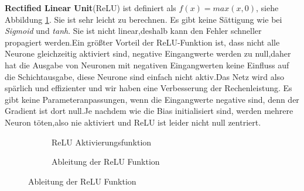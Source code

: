 \documentclass[12pt,a4paper]{scrartcl}
\numberwithin{equation}{section}
\begin{document}
	\textbf{Rectified Linear Unit}(ReLU) ist definiert als $f(x)= max(x,0) $, siehe Abbildung \ref{fig:relu}. Sie ist sehr leicht zu berechnen. Es gibt keine Sättigung wie bei \textit{Sigmoid} und \textit{tanh}. Sie ist nicht linear,deshalb kann den Fehler schneller propagiert werden.Ein größter Vorteil der ReLU-Funktion ist, dass nicht alle Neurone gleichzeitig aktiviert sind, negative Eingangwerte werden zu null,daher hat die Ausgabe von Neuronen mit negativen Eingangwerten keine Einfluss auf die Schichtausgabe, diese Neurone sind einfach nicht aktiv.Das Netz wird also spärlich und effizienter und wir haben eine Verbesserung der Rechenleistung.
	Es gibt keine Parameteranpassungen, wenn die Eingangwerte negative sind, denn der Gradient ist dort null.Je nachdem wie die Bias initialisiert sind, werden mehrere Neuron töten,also nie aktiviert und ReLU ist leider nicht null zentriert.
		\begin{figure}[h]
			\caption{ReLU Aktivierungsfunktion}
		\begin{subfigure}{.5\textwidth}
			\centering
			\caption{ReLU Aktivierungsfunktion}

		\end{subfigure}%
		\begin{subfigure}{.5\textwidth}
			\centering
			\caption{Ableitung der ReLU Funktion}
			
		\end{subfigure}
		\label{fig:relu}
	\end{figure}
	
\end{document}

